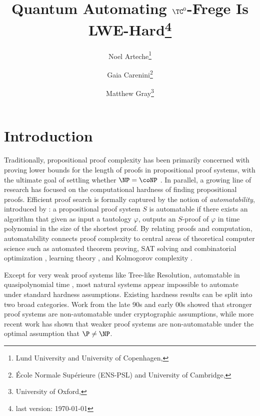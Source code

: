 \documentclass[11pt]{article}
\title{Quantum Automating $\TC^0$-Frege Is LWE-Hard\footnote{last version: \today}}
\date{}
\author{
    Noel Arteche\footnote{Lund University and University of Copenhagen, \email{noel.arteche@cs.lth.se}} \and
    Gaia Carenini\footnote{École Normale Supérieure (ENS-PSL) and University of Cambridge, \email{gaia.carenini@ens.psl.eu}} \and
    Matthew Gray\footnote{University of Oxford, \email{matthew.gray@cs.ox.ac.uk}}
}
\theoremstyle{definition}
\theoremstyle{plain}
\theoremstyle{remark}
\begin{document}
\maketitle
{}

 

\section{Introduction}
\label{sec:intro}
Traditionally, propositional proof complexity has been primarily concerned with proving lower bounds for the length of proofs in propositional proof systems, with the ultimate goal of settling whether $\NP = \coNP$ \cite{cookReckhow}. In parallel, a growing line of research has focused on the computational hardness of finding propositional proofs. Efficient proof search is formally captured by the notion of \emph{automatability}, introduced by \citeauthor{BPR1997} \cite{BPR1997}: a propositional proof system $S$ is automatable if there exists an algorithm that given as input a tautology $\varphi$, outputs an $S$-proof of $\varphi$ in time polynomial in the size of the shortest proof. By relating proofs and computation, automatability connects proof complexity to central areas of theoretical computer science such as automated theorem proving, SAT solving and combinatorial optimization \cite{jakob}, learning theory \cite{AleknovichLearning, pichLearning}, and Kolmogorov complexity \cite{krajicekKolmo}.

Except for very weak proof systems like Tree-like Resolution, automatable in quasipolynomial time \cite{BP96}, most natural systems appear impossible to automate under standard hardness assumptions. Existing hardness results can be split into two broad categories. Work from the late 90s and early 00s showed that stronger proof systems are non-automatable under cryptographic assumptions, while more recent work has shown that weaker proof systems are non-automatable under the optimal assumption that $\P \neq \NP$.
\end{document}

